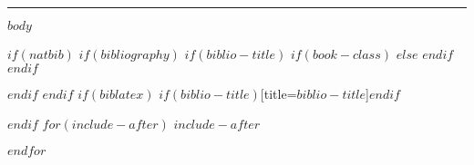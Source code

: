 \documentclass[$if(fontsize)$$fontsize$,$endif$$if(lang)$$babel-lang$,$endif$$if(papersize)$$papersize$paper,$endif$$for(classoption)$$classoption$$sep$,$endfor$]{$documentclass$}
\renewcommand{\href}[2]{#2\footnote{\url{#1}}}
\begin{document}


\vspace{2 mm}

\hrule

$body$

\pagestyle{regular} %

$if(natbib)$
$if(bibliography)$
$if(biblio-title)$
$if(book-class)$
\renewcommand\bibname{$biblio-title$}
$else$
\renewcommand\refname{$biblio-title$}
$endif$
$endif$


$endif$
$endif$
$if(biblatex)$
\printbibliography$if(biblio-title)$[title=$biblio-title$]$endif$

$endif$
$for(include-after)$
$include-after$

$endfor$
\end{document}
